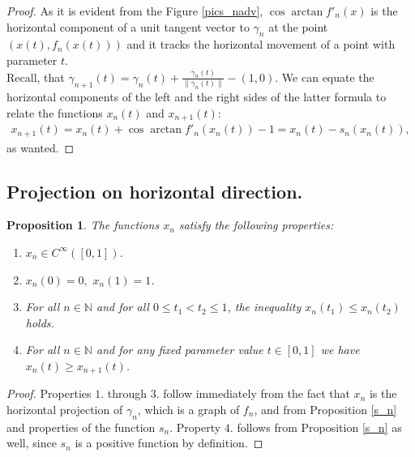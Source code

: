 \documentclass{article}
\newtheorem{prop}[theorem]{Proposition}
\theoremstyle{definition}
\newcommand{\lt}{\left}
\newcommand{\rt}{\right}
\newcommand{\N}{{\mathbb N}}
\newcommand{\Le}{\leqslant}
\newcommand{\Ge}{\geqslant}
\newcommand{\Inf}{\infty}
\begin{document}
    \begin{proof}[Proof]
        As it is evident from the Figure \ref{pics_nadv}, $\cos\arctan{f'_n(x)}$ is the horizontal component of a unit tangent vector to $\gamma_n$ at the point $\lt(x(t), f_n(x(t))\rt)$ and it tracks the horizontal movement of a point with parameter $t$.\\
    
        Recall, that $\gamma_{n+1}(t) = \gamma_n(t) + \frac{\dot{\gamma_n}(t)}{\|\dot{\gamma_n}(t)\|} - (1, 0)$. We can equate the horizontal components of the left and the right sides of the latter formula to relate the functions $x_n(t)$ and $x_{n+1}(t)$:
        \begin{align*}
            x_{n+1}(t) = x_n(t) + \cos\arctan{f'_n(x_n(t))} - 1 = x_n(t) - s_n(x_n(t)),
        \end{align*}
        as wanted.
    \end{proof}

\subsection{Projection on horizontal direction.}

    \begin{prop}\label{x_nprop}
        The functions $x_n$ satisfy the following properties:
        \begin{enumerate}
            \item $x_n\in C^\Inf\lt([0, 1]\rt)$.\\
        
            \item $x_n(0) = 0,\,\, x_n(1) = 1$.\\
        
            \item For all $n\in\N$ and for all $0 \Le t_1 < t_2\Le 1$, the inequality $x_n(t_1)\Le x_n(t_2)$ holds.\\
        
            \item For all $n\in\N$ and for any fixed parameter value $t\in[0,1]$ we have $x_n(t)\Ge x_{n+1}(t)$.\\
        
        \end{enumerate}
    \end{prop}

    \begin{proof}
        Properties $1.$ through $3.$ follow immediately from the fact that $x_n$ is the horizontal projection of $\gamma_n$, which is a graph of $f_n$, and from Proposition \ref{s_n} and properties of the function $s_n$. Property $4.$ follows from Proposition \ref{s_n} as well, since $s_n$ is a positive function by definition.
    \end{proof}
    
\end{document}
